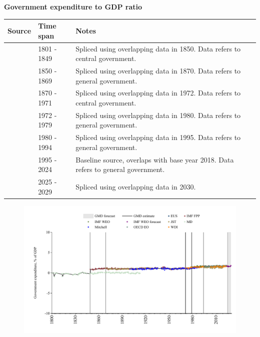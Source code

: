 \documentclass[12pt,a4paper,landscape]{article}
\begin{document}
\begin{adjustbox}{max totalsize={\paperwidth}{\paperheight},center}
\begin{minipage}[t][\textheight][t]{\textwidth}
\vspace*{0.5cm}
{}
\begin{center}
{\Large\bfseries Government expenditure to GDP ratio}
\end{center}
\vspace{0.5cm}
\begin{table}[H]
\centering
\small
\begin{tabular}{|l|l|l|}
\hline
\textbf{Source} & \textbf{Time span} & \textbf{Notes} \\
\hline
\rowcolor{white}\cite{MD}& 1801 - 1849 &Spliced using overlapping data in 1850. Data refers to central government.\\
\rowcolor{lightgray}\cite{IMF_FPP}& 1850 - 1869 &Spliced using overlapping data in 1870. Data refers to general government.\\
\rowcolor{white}\cite{JST}& 1870 - 1971 &Spliced using overlapping data in 1972. Data refers to central government.\\
\rowcolor{lightgray}\cite{WDI}& 1972 - 1979 &Spliced using overlapping data in 1980. Data refers to general government.\\
\rowcolor{white}\cite{IMF_WEO}& 1980 - 1994 &Spliced using overlapping data in 1995. Data refers to general government.\\
\rowcolor{lightgray}\cite{EUS}& 1995 - 2024 &Baseline source, overlaps with base year 2018. Data refers to general government.\\
\rowcolor{white}\cite{IMF_WEO_forecast}& 2025 - 2029 &Spliced using overlapping data in 2030. \\
\hline
\end{tabular}
\end{table}
\begin{figure}[H]
\centering
\includegraphics[width=\textwidth,height=0.6\textheight,keepaspectratio]{graphs/ESP_govexp_GDP.pdf}
\end{figure}
\end{minipage}
\end{adjustbox}
\end{document}
